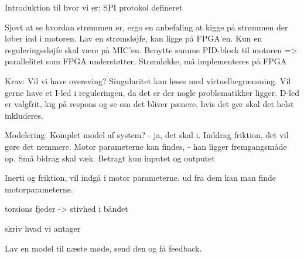Introduktion til hvor vi er: SPI protokol defineret

Sjovt at se hvordan strømmen er, ergo en anbefaling at kigge på strømmen der løber ind i motoren. Lav en strømsløjfe, kan ligge på FPGA'en. Kun en reguleringssløjfe skal være på MIC'en. Benytte samme PID-block til motoren => parallelitet som FPGA understøtter.
    Strømløkke, må implementeres på FPGA

Krav: 
Vil vi have oversving? Singularitet kan løses med virtuelbegrænsning. Vil gerne have et I-led i reguleringen, da det er der nogle problematikker ligger. D-led er valgfrit, kig på respons og se om det bliver pænere, hvis det gør skal det helst inkluderes. 

Modelering: 
Komplet model af system? - ja, det skal i. Inddrag friktion, det vil gøre det nemmere. Motor parameterne kan findes, - han ligger fremgangsmåde op. Små bidrag skal væk. Betragt kun inputet og outputet

Inerti og friktion, vil indgå i motor parameterne. ud fra dem kan man finde motorparameterne. 

torsions fjeder -> stivhed i båndet

skriv hvad vi antager


Lav en model til næste møde, send den og få feedback. 
